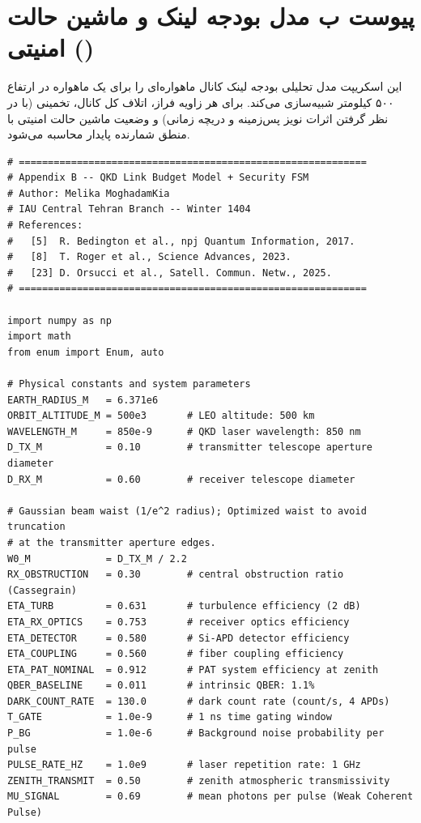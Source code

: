 \documentclass[a4paper,14pt]{extreport}
\begin{document}
\section*{پیوست ب مدل بودجه لینک  و ماشین حالت امنیتی ()}

این اسکریپت مدل تحلیلی بودجه لینک کانال  ماهواره‌ای را برای یک ماهواره
 در ارتفاع ۵۰۰ کیلومتر شبیه‌سازی می‌کند. برای هر زاویه فراز،
اتلاف کل کانال،  تخمینی (با در نظر گرفتن اثرات نویز پس‌زمینه و دریچه زمانی) و وضعیت ماشین حالت امنیتی با منطق شمارنده پایدار محاسبه می‌شود.

\vspace{0.3cm}

\begin{latin}
\small
\begin{verbatim}
# ============================================================
# Appendix B -- QKD Link Budget Model + Security FSM
# Author: Melika MoghadamKia
# IAU Central Tehran Branch -- Winter 1404
# References:
#   [5]  R. Bedington et al., npj Quantum Information, 2017.
#   [8]  T. Roger et al., Science Advances, 2023.
#   [23] D. Orsucci et al., Satell. Commun. Netw., 2025.
# ============================================================

import numpy as np
import math
from enum import Enum, auto

# Physical constants and system parameters
EARTH_RADIUS_M   = 6.371e6
ORBIT_ALTITUDE_M = 500e3       # LEO altitude: 500 km
WAVELENGTH_M     = 850e-9      # QKD laser wavelength: 850 nm
D_TX_M           = 0.10        # transmitter telescope aperture diameter
D_RX_M           = 0.60        # receiver telescope diameter

# Gaussian beam waist (1/e^2 radius); Optimized waist to avoid truncation 
# at the transmitter aperture edges.
W0_M             = D_TX_M / 2.2 
RX_OBSTRUCTION   = 0.30        # central obstruction ratio (Cassegrain)
ETA_TURB         = 0.631       # turbulence efficiency (2 dB)
ETA_RX_OPTICS    = 0.753       # receiver optics efficiency
ETA_DETECTOR     = 0.580       # Si-APD detector efficiency
ETA_COUPLING     = 0.560       # fiber coupling efficiency
ETA_PAT_NOMINAL  = 0.912       # PAT system efficiency at zenith
QBER_BASELINE    = 0.011       # intrinsic QBER: 1.1%
DARK_COUNT_RATE  = 130.0       # dark count rate (count/s, 4 APDs)
T_GATE           = 1.0e-9      # 1 ns time gating window
P_BG             = 1.0e-6      # Background noise probability per pulse
PULSE_RATE_HZ    = 1.0e9       # laser repetition rate: 1 GHz
ZENITH_TRANSMIT  = 0.50        # zenith atmospheric transmissivity
MU_SIGNAL        = 0.69        # mean photons per pulse (Weak Coherent Pulse)


\end{verbatim}
\end{latin}
\end{document}
